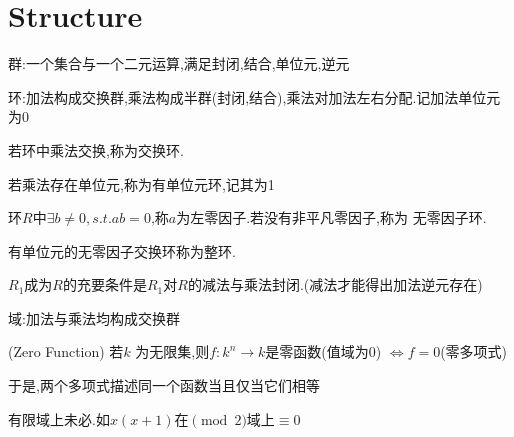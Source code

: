 \section{Structure}
群:一个集合与一个二元运算,满足封闭,结合,单位元,逆元

环:加法构成交换群,乘法构成半群(封闭,结合),乘法对加法左右分配.记加法单位元为0

若环中乘法交换,称为交换环.

若乘法存在单位元,称为有单位元环,记其为1

环$ R$中$\exists b\ne 0,s.t.ab=0$,称$ a$为左零因子.若没有非平凡零因子,称为
无零因子环.

有单位元的无零因子交换环称为整环.

$ R_1$成为$ R$的充要条件是$ R_1$对$ R$的减法与乘法封闭.(减法才能得出加法逆元存在)

域:加法与乘法均构成交换群




(Zero Function) 若$ k$ 为无限集,则$ f:k^n\rightarrow k$是零函数(值域为0)
$ \Leftrightarrow f=0$(零多项式)

于是,两个多项式描述同一个函数当且仅当它们相等

有限域上未必.如$ x(x+1)$在$ \pmod 2$域上$ \equiv 0$
